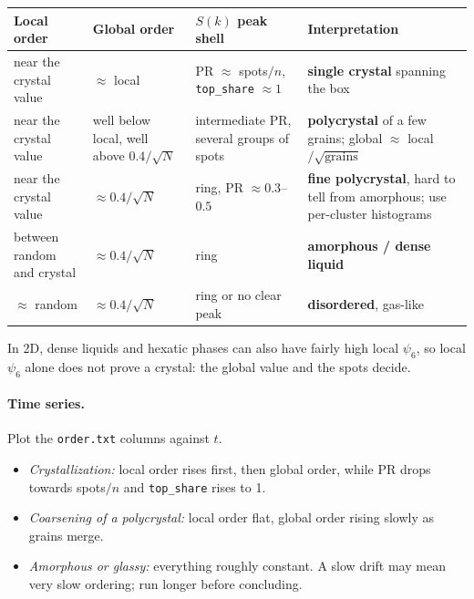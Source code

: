 \documentclass[11pt]{article}
\newcommand{\code}[1]{\texttt{#1}}
\begin{document}
\begin{center}
\begin{tabularx}{\textwidth}{@{}L L L L@{}}
\toprule
Local order & Global order & $S(k)$ peak shell & Interpretation \\
\midrule
near the crystal value & $\approx$ local & PR $\approx$ spots$/n$, \code{top\_share} $\approx1$ & \textbf{single crystal} spanning the box \\
near the crystal value & well below local, well above $0.4/\sqrt N$ & intermediate PR, several groups of spots & \textbf{polycrystal} of a few grains; global $\approx$ local$/\sqrt{\text{grains}}$ \\
near the crystal value & $\approx0.4/\sqrt N$ & ring, PR $\approx0.3$--$0.5$ & \textbf{fine polycrystal}, hard to tell from amorphous; use per-cluster histograms \\
between random and crystal & $\approx0.4/\sqrt N$ & ring & \textbf{amorphous / dense liquid} \\
$\approx$ random & $\approx0.4/\sqrt N$ & ring or no clear peak & \textbf{disordered}, gas-like \\
\bottomrule
\end{tabularx}
\end{center}
In 2D, dense liquids and hexatic phases can also have fairly high local
$\psi_6$, so local $\psi_6$ alone does not prove a crystal: the global value
and the spots decide.

\paragraph{Time series.} Plot the \code{order.txt} columns against $t$.
\begin{itemize}[nosep]
  \item \emph{Crystallization:} local order rises first, then global order,
        while PR drops towards spots$/n$ and \code{top\_share} rises to 1.
  \item \emph{Coarsening of a polycrystal:} local order flat, global order
        rising slowly as grains merge.
  \item \emph{Amorphous or glassy:} everything roughly constant. A slow drift
        may mean very slow ordering; run longer before concluding.
\end{itemize}
\end{document}
